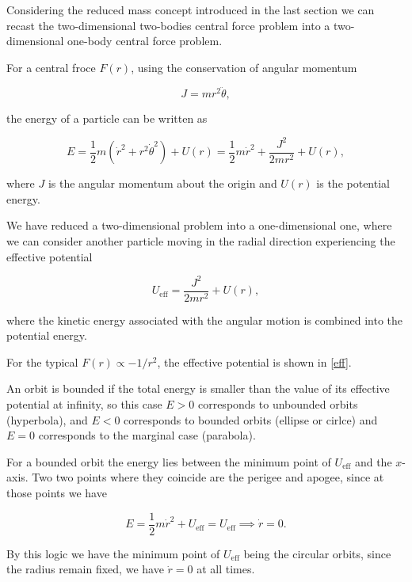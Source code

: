 \documentclass[a4paper,12pt]{report}
\begin{document}
Considering the reduced mass concept introduced in the last section we can recast the two-dimensional two-bodies central force problem into a two-dimensional one-body central force problem.

For a central froce \(F(r)\), using the conservation of angular momentum 

\begin{equation}
	J = mr^2 \ddot{\theta }, 
\end{equation}

the energy of a particle can be written as 

\begin{equation}
	E = \frac{1}{2}m(\dot{r} ^2+ r^2 \dot{\theta }^2 ) + U(r) = \frac{1}{2}m\dot{r} ^2 + \frac{J^2}{2mr^2} + U(r), 
\end{equation}

where \(J\) is the angular momentum about the origin and \(U(r)\) is the potential energy. 

We have reduced a two-dimensional problem into a one-dimensional one, where we can consider another particle moving in the radial direction experiencing the effective potential 

\begin{equation}
	U_{\text{eff} } = \frac{J^2}{2mr^2} + U(r), 
\end{equation}

where the kinetic energy associated with the angular motion is combined into the potential energy.

For the typical \(F(r) \propto -1/r^2\), the effective potential is shown in \cref{eff}.


An orbit is bounded if the total energy is smaller than the value of its effective potential at infinity, so this case \(E > 0\) corresponds to unbounded orbits (hyperbola), and \(E < 0\) corresponds to bounded orbits (ellipse or cirlce) and \(E = 0\) corresponds to the marginal case (parabola). 

For a bounded orbit the energy lies between the minimum point of \(U_{\text{eff} } \) and the \(x\)-axis. Two two points where they coincide are the perigee and apogee, since at those points we have 

\begin{equation}
	E = \frac{1}{2}m \dot{r} ^2 + U_{\text{eff} } = U_{\text{eff} } \implies \dot{r} =0. 
\end{equation}

By this logic we have the minimum point of \(U_{\text{eff} } \) being the circular orbits, since the radius remain fixed, we have \(\dot{r} = 0\) at all times. 
\end{document}
